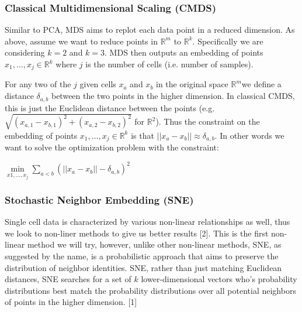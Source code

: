 \documentclass{article} %
\begin{document}
\subsubsection{Classical Multidimensional Scaling (CMDS)}
Similar to PCA, MDS aims to replot each data point in a reduced dimension. As above, assume we want to reduce points in {$\mathbb{R}^m$} to {$ \mathbb{R}^k $}. Specifically we are considering {$k=2$} and {$k=3$}. MDS then outputs an embedding of points {$x_1,\ldots,x_j \in \mathbb{R}^k $} where {$j$} is the number of cells (i.e. number of samples). 

For any two of the {$j$} given cells {$ x_a $} and {$x_b$} in the original space {$\mathbb{R}^m$}we define a distance {$\delta_{a,b} $} between the two points in the higher dimension. In classical CMDS, this is just the Euclidean distance between the points (e.g. {$\sqrt{(x_{a,1}-x_{b,1})^2 + (x_{a,2}-x_{b,2})^2}$} for {$\mathbb{R}^2$}). Thus the constraint on the embedding of points {$x_1,\ldots,x_j \in \mathbb{R}^k $} is that {$ || x_a -x_b||\approx \delta_{a,b} $}. In other words we want to solve the optimization problem with the constraint: 
\begin{center}
{$ \min\limits_{x1,\ldots,x_j} \sum_{a<b} (|| x_a -x_b|| - \delta_{a,b})^2 $}
\end{center}

\subsubsection{Stochastic Neighbor Embedding (SNE)}
Single cell data is characterized by various non-linear relationships as well, thus we look to non-liner methods to give us better results [2]. This is the first non-linear method we will try, however, unlike other non-linear methods, SNE, as suggested by the name, is a probabilistic approach that aims to preserve the distribution of neighbor identities. SNE, rather than just matching Euclidean distances,  SNE searches for a set of {$ k $} lower-dimensional vectors who's probability distributions best match the probability distributions over all potential neighbors of points in the higher dimension. [1]
\end{document}

